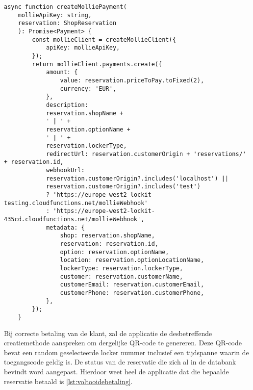\begin{lstlisting}[caption={Mollie betaling aanmaken met nodige data.}, label={lst:aanmakenBetalingMollie}]
    async function createMolliePayment(
    mollieApiKey: string,
    reservation: ShopReservation
    ): Promise<Payment> {
        const mollieClient = createMollieClient({
            apiKey: mollieApiKey,
        });
        return mollieClient.payments.create({
            amount: {
                value: reservation.priceToPay.toFixed(2),
                currency: 'EUR',
            },
            description:
            reservation.shopName +
            ' | ' +
            reservation.optionName +
            ' | ' +
            reservation.lockerType,
            redirectUrl: reservation.customerOrigin + 'reservations/' + reservation.id,
            webhookUrl:
            reservation.customerOrigin?.includes('localhost') ||
            reservation.customerOrigin?.includes('test')
            ? 'https://europe-west2-lockit-testing.cloudfunctions.net/mollieWebhook'
            : 'https://europe-west2-lockit-435cd.cloudfunctions.net/mollieWebhook',
            metadata: {
                shop: reservation.shopName,
                reservation: reservation.id,
                option: reservation.optionName,
                location: reservation.optionLocationName,
                lockerType: reservation.lockerType,
                customer: reservation.customerName,
                customerEmail: reservation.customerEmail,
                customerPhone: reservation.customerPhone,
            },
        });
    }
    \end{lstlisting}

Bij correcte betaling van de klant, zal de applicatie de desbetreffende creatiemethode aanspreken om dergelijke QR-code te genereren. Deze QR-code bevat een random geselecteerde locker nummer inclusief een tijdspanne waarin de toegangscode geldig is. De status van de reservatie die zich al in de databank bevindt word aangepast. Hierdoor weet heel de applicatie dat die bepaalde reservatie betaald is \ref{lst:voltooidebetaling}.


